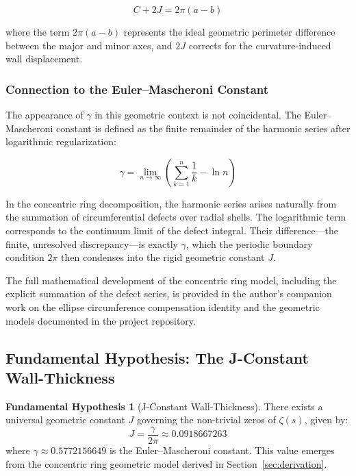 \documentclass[11pt,a4paper]{article}
\theoremstyle{definition}
\newtheorem{hypothesis}{Fundamental Hypothesis}[section]
\begin{document}
\begin{equation}
C + 2J = 2\pi(a-b)
\end{equation}

where the term \(2\pi(a-b)\) represents the ideal geometric perimeter difference between the major and minor axes, and \(2J\) corrects for the curvature-induced wall displacement.

\subsubsection*{Connection to the Euler--Mascheroni Constant}
The appearance of \(\gamma\) in this geometric context is not coincidental. The Euler--Mascheroni constant is defined as the finite remainder of the harmonic series after logarithmic regularization:

\begin{equation}
\gamma = \lim_{n \to \infty} \left( \sum_{k=1}^{n} \frac{1}{k} - \ln n \right)
\end{equation}

In the concentric ring decomposition, the harmonic series arises naturally from the summation of circumferential defects over radial shells. The logarithmic term corresponds to the continuum limit of the defect integral. Their difference---the finite, unresolved discrepancy---is exactly \(\gamma\), which the periodic boundary condition \(2\pi\) then condenses into the rigid geometric constant \(J\).

The full mathematical development of the concentric ring model, including the explicit summation of the defect series, is provided in the author's companion work on the ellipse circumference compensation identity and the geometric models documented in the project repository.

\subsection{Fundamental Hypothesis: The J-Constant Wall-Thickness}

\begin{hypothesis}[J-Constant Wall-Thickness]\label{hyp:J}
There exists a universal geometric constant \(J\) governing the non-trivial zeros of \(\zeta(s)\), given by:
\begin{equation}
J = \frac{\gamma}{2\pi} \approx 0.0918667263
\end{equation}
where \(\gamma \approx 0.5772156649\) is the Euler--Mascheroni constant. 
This value emerges from the concentric ring geometric model derived in Section~\ref{sec:derivation}.
\end{hypothesis}
\end{document}
